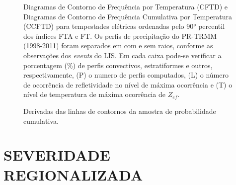 \begin{figure}
  \caption{Diagramas de Contorno de Frequência por Temperatura (CFTD) e Diagramas de Contorno de Frequência Cumulativa por Temperatura (CCFTD)  para tempestades elétricas ordenadas pelo 90° percentil dos índices FTA e FT. Os perfis de precipitação do PR-TRMM (1998-2011) foram separados em com e sem raios, conforme as observações dos \textit{events} do LIS. Em cada caixa pode-se verificar a porcentagem (\%) de perfis convectivos, estratiformes e outros, respectivamente, (P) o numero de perfis computados, (L) o número de ocorrência de refletividade no nível de máxima ocorrência e (T) o nível de temperatura de máxima ocorrência de $Z_{ef}$. }
\label{cftdccftd}
\end{figure} 

\begin{figure}

  \caption{Derivadas das linhas de contornos da amostra de probabilidade cumulativa.}
\end{figure}


\section{SEVERIDADE REGIONALIZADA}



